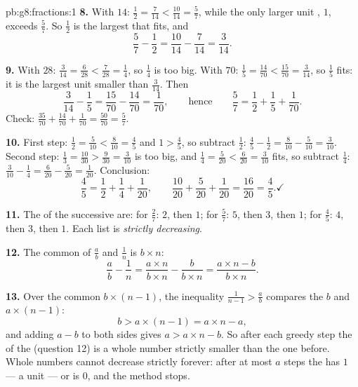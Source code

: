 \begin{solution}{pb:g8:fractions:1}
\textbf{8.} With  $14$: $\frac12 = \frac{7}{14} <
\frac{10}{14} = \frac57$, while the only larger unit ,
$1$, exceeds $\frac57$. So $\frac12$ is the largest that fits,
and
\[
\frac57 - \frac12 = \frac{10}{14} - \frac{7}{14} = \frac{3}{14} .
\]

\textbf{9.} With  $28$: $\frac{3}{14} = \frac{6}{28} <
\frac{7}{28} = \frac14$, so $\frac14$ is too big. With
 $70$: $\frac15 = \frac{14}{70} < \frac{15}{70} =
\frac{3}{14}$, so $\frac15$ fits: it is the largest unit 
smaller than $\frac{3}{14}$. Then
\[
\frac{3}{14} - \frac15 = \frac{15}{70} - \frac{14}{70}
= \frac{1}{70},
\qquad\text{hence}\qquad
\frac57 = \frac12 + \frac15 + \frac{1}{70} .
\]
Check: $\frac{35}{70} + \frac{14}{70} + \frac{1}{70} =
\frac{50}{70} = \frac57$.

\textbf{10.} First step: $\frac12 = \frac{5}{10} < \frac{8}{10} =
\frac45$ and $1 > \frac45$, so subtract $\frac12$:
$\frac45 - \frac12 = \frac{8}{10} - \frac{5}{10} = \frac{3}{10}$.
Second step: $\frac13 = \frac{10}{30} > \frac{9}{30} =
\frac{3}{10}$ is too big, and $\frac14 = \frac{5}{20} <
\frac{6}{20} = \frac{3}{10}$ fits, so subtract $\frac14$:
$\frac{3}{10} - \frac14 = \frac{6}{20} - \frac{5}{20} =
\frac{1}{20}$. Conclusion:
\[
\frac45 = \frac12 + \frac14 + \frac{1}{20},
\qquad
\frac{10}{20} + \frac{5}{20} + \frac{1}{20} = \frac{16}{20}
= \frac45 . \checkmark
\]

\textbf{11.} The  of the successive  are:
for $\frac27$: $2$, then $1$; for $\frac57$: $5$, then $3$, then
$1$; for $\frac45$: $4$, then $3$, then $1$. Each list is
\emph{strictly decreasing}.

\textbf{12.} The common  of $\frac ab$ and $\frac1n$
is $b \times n$:
\[
\frac{a}{b} - \frac{1}{n}
= \frac{a \times n}{b \times n} - \frac{b}{b \times n}
= \frac{a \times n - b}{b \times n} .
\]

\textbf{13.} Over the common  $b \times (n-1)$, the
inequality $\frac{1}{n-1} > \frac ab$ compares the 
$b$ and $a \times (n - 1)$:
\[
b > a \times (n - 1) = a \times n - a ,
\]
and adding $a - b$ to both sides gives $a > a \times n - b$. So
after each greedy step the  of the  (question
12) is a whole number strictly smaller than the one before. Whole
numbers cannot decrease strictly forever: after at most $a$ steps
the  has  $1$ --- a unit  --- or is
$0$, and the method stops.


\end{solution}
